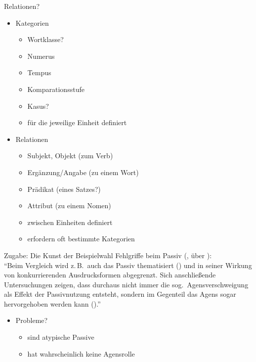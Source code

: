 \begin{frame}
  {Relationen?}
  \pause
  \begin{itemize}[<+->]
    \item \alert{Kategorien}
      \begin{itemize}[<+->]
        \item Wortklasse?
        \item Numerus
        \item Tempus
        \item Komparationsstufe
        \item Kasus?
          \Halbzeile
        \item \alert{für die jeweilige Einheit definiert}
      \end{itemize}
      \Halbzeile
    \item \alert{Relationen}
      \begin{itemize}[<+->]
        \item Subjekt, Objekt (zum Verb)
        \item Ergänzung\slash Angabe (zu einem Wort)
        \item Prädikat (eines Satzes?)
        \item Attribut (zu einem Nomen)
          \Halbzeile
        \item \alert{zwischen Einheiten definiert}
        \item \alert{erfordern oft bestimmte Kategorien}
      \end{itemize}
  \end{itemize}
  \pause
  \Halbzeile
\end{frame}

\begin{frame}
  {Zugabe: Die Kunst der Beispielwahl}
  \pause
  Fehlgriffe beim \alert{Passiv} (\citealt{Gornik2003}, über \citealt{Klotz1995}):\\
  \Zeile
  \pause
  "`Beim Vergleich wird z.\,B.\ auch das Passiv thematisiert () und in seiner Wirkung von konkurrierenden Ausdrucksformen abgegrenzt.
  Sich anschließende Untersuchungen zeigen, dass durchaus nicht immer die sog.\ Agensverschweigung als Effekt der Passivnutzung entsteht, sondern im Gegenteil das Agens sogar hervorgehoben werden kann ()."'\\
  \Halbzeile
  \pause
  \begin{itemize}[<+->]
    \item Probleme?
    \begin{itemize}[<+->]
      \item {} sind atypische Passive
      \item {} hat wahrscheinlich keine Agensrolle
    \end{itemize}
  \end{itemize}
\end{frame}

